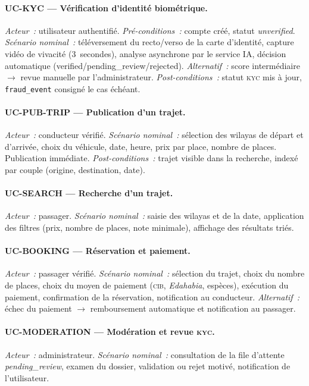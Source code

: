 \documentclass[12pt, a4paper, oneside]{report}
\begin{document}
\paragraph{UC-KYC --- Vérification d'identité biométrique.}
\textit{Acteur~:} utilisateur authentifié.
\textit{Pré-conditions~:} compte créé, statut \textit{unverified}.
\textit{Scénario nominal~:} téléversement du recto/verso de la carte d'identité, capture vidéo de vivacité (3~secondes), analyse asynchrone par le service IA, décision automatique (verified/pending\_review/rejected).
\textit{Alternatif~:} score intermédiaire $\to$ revue manuelle par l'administrateur.
\textit{Post-conditions~:} statut \textsc{kyc} mis à jour, \texttt{fraud\_event} consigné le cas échéant.

\paragraph{UC-PUB-TRIP --- Publication d'un trajet.}
\textit{Acteur~:} conducteur vérifié.
\textit{Scénario nominal~:} sélection des wilayas de départ et d'arrivée, choix du véhicule, date, heure, prix par place, nombre de places. Publication immédiate.
\textit{Post-conditions~:} trajet visible dans la recherche, indexé par couple (origine, destination, date).

\paragraph{UC-SEARCH --- Recherche d'un trajet.}
\textit{Acteur~:} passager.
\textit{Scénario nominal~:} saisie des wilayas et de la date, application des filtres (prix, nombre de places, note minimale), affichage des résultats triés.

\paragraph{UC-BOOKING --- Réservation et paiement.}
\textit{Acteur~:} passager vérifié.
\textit{Scénario nominal~:} sélection du trajet, choix du nombre de places, choix du moyen de paiement (\textsc{cib}, \textit{Edahabia}, espèces), exécution du paiement, confirmation de la réservation, notification au conducteur.
\textit{Alternatif~:} échec du paiement $\to$ remboursement automatique et notification au passager.

\paragraph{UC-MODERATION --- Modération et revue \textsc{kyc}.}
\textit{Acteur~:} administrateur.
\textit{Scénario nominal~:} consultation de la file d'attente \textit{pending\_review}, examen du dossier, validation ou rejet motivé, notification de l'utilisateur.
\end{document}

